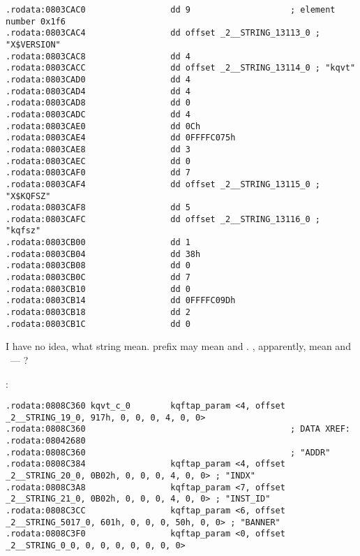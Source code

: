 \begin{lstlisting}[caption=kqf.o]
.rodata:0803CAC0                 dd 9                    ; element number 0x1f6
.rodata:0803CAC4                 dd offset _2__STRING_13113_0 ; "X$VERSION"
.rodata:0803CAC8                 dd 4
.rodata:0803CACC                 dd offset _2__STRING_13114_0 ; "kqvt"
.rodata:0803CAD0                 dd 4
.rodata:0803CAD4                 dd 4
.rodata:0803CAD8                 dd 0
.rodata:0803CADC                 dd 4
.rodata:0803CAE0                 dd 0Ch
.rodata:0803CAE4                 dd 0FFFFC075h
.rodata:0803CAE8                 dd 3
.rodata:0803CAEC                 dd 0
.rodata:0803CAF0                 dd 7
.rodata:0803CAF4                 dd offset _2__STRING_13115_0 ; "X$KQFSZ"
.rodata:0803CAF8                 dd 5
.rodata:0803CAFC                 dd offset _2__STRING_13116_0 ; "kqfsz"
.rodata:0803CB00                 dd 1
.rodata:0803CB04                 dd 38h
.rodata:0803CB08                 dd 0
.rodata:0803CB0C                 dd 7
.rodata:0803CB10                 dd 0
.rodata:0803CB14                 dd 0FFFFC09Dh
.rodata:0803CB18                 dd 2
.rodata:0803CB1C                 dd 0
\end{lstlisting}

{I have no idea, what  string mean.} 
{ prefix may mean  and .} 
{, apparently, mean  and  ~--- ?} 

 :

\begin{lstlisting}[caption=kqf.o]
.rodata:0808C360 kqvt_c_0        kqftap_param <4, offset _2__STRING_19_0, 917h, 0, 0, 0, 4, 0, 0>
.rodata:0808C360                                         ; DATA XREF: .rodata:08042680
.rodata:0808C360                                         ; "ADDR"
.rodata:0808C384                 kqftap_param <4, offset _2__STRING_20_0, 0B02h, 0, 0, 0, 4, 0, 0> ; "INDX"
.rodata:0808C3A8                 kqftap_param <7, offset _2__STRING_21_0, 0B02h, 0, 0, 0, 4, 0, 0> ; "INST_ID"
.rodata:0808C3CC                 kqftap_param <6, offset _2__STRING_5017_0, 601h, 0, 0, 0, 50h, 0, 0> ; "BANNER"
.rodata:0808C3F0                 kqftap_param <0, offset _2__STRING_0_0, 0, 0, 0, 0, 0, 0, 0>
\end{lstlisting}

